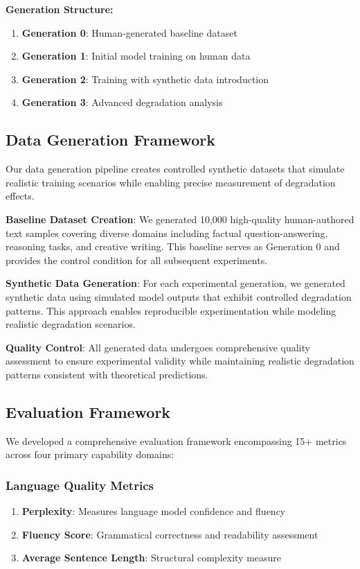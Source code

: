 \documentclass{article}
\begin{document}
\textbf{Generation Structure:}
\begin{enumerate}
    \item \textbf{Generation 0}: Human-generated baseline dataset
    \item \textbf{Generation 1}: Initial model training on human data
    \item \textbf{Generation 2}: Training with synthetic data introduction
    \item \textbf{Generation 3}: Advanced degradation analysis
\end{enumerate}

\subsection{Data Generation Framework}

Our data generation pipeline creates controlled synthetic datasets that simulate realistic training scenarios while enabling precise measurement of degradation effects.

\textbf{Baseline Dataset Creation}: We generated 10,000 high-quality human-authored text samples covering diverse domains including factual question-answering, reasoning tasks, and creative writing. This baseline serves as Generation 0 and provides the control condition for all subsequent experiments.

\textbf{Synthetic Data Generation}: For each experimental generation, we generated synthetic data using simulated model outputs that exhibit controlled degradation patterns. This approach enables reproducible experimentation while modeling realistic degradation scenarios.

\textbf{Quality Control}: All generated data undergoes comprehensive quality assessment to ensure experimental validity while maintaining realistic degradation patterns consistent with theoretical predictions.

\subsection{Evaluation Framework}

We developed a comprehensive evaluation framework encompassing 15+ metrics across four primary capability domains:

\subsubsection{Language Quality Metrics}
\begin{enumerate}
    \item \textbf{Perplexity}: Measures language model confidence and fluency
    \item \textbf{Fluency Score}: Grammatical correctness and readability assessment
    \item \textbf{Average Sentence Length}: Structural complexity measure
\end{enumerate}
\end{document}
